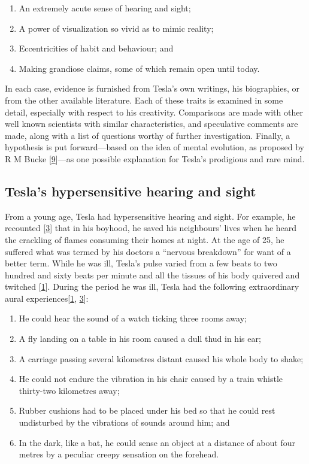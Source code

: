 \documentclass[
  a4paper,
]{article}
\providecommand{\tightlist}{%
  \setlength{\itemsep}{0pt}\setlength{\parskip}{0pt}}
\begin{document}
\begin{enumerate}
\tightlist
\item
  An extremely acute sense of hearing and sight;
\item
  A power of visualization so vivid as to mimic reality;
\item
  Eccentricities of habit and behaviour; and
\item
  Making grandiose claims, some of which remain open until today.
\end{enumerate}

In each case, evidence is furnished from Tesla's own writings, his
biographies, or from the other available literature. Each of these
traits is examined in some detail, especially with respect to his
creativity. Comparisons are made with other well known scientists with
similar characteristics, and speculative comments are made, along with a
list of questions worthy of further investigation. Finally, a hypothesis
is put forward---based on the idea of mental evolution, as proposed by R
M Bucke {[}\protect\hyperlink{ref-bucke48}{9}{]}---as one possible
explanation for Tesla's prodigious and rare mind.

\hypertarget{teslas-hypersensitive-hearing-and-sight}{%
\subsection{Tesla's hypersensitive hearing and
sight}\label{teslas-hypersensitive-hearing-and-sight}}

From a young age, Tesla had hypersensitive hearing and sight. For
example, he recounted {[}\protect\hyperlink{ref-cheney81}{3}{]} that in
his boyhood, he saved his neighbours' lives when he heard the crackling
of flames consuming their homes at night. At the age of 25, he suffered
what was termed by his doctors a ``nervous breakdown'' for want of a
better term. While he was ill, Tesla's pulse varied from a few beats to
two hundred and sixty beats per minute and all the tissues of his body
quivered and twitched {[}\protect\hyperlink{ref-john83}{1}{]}. During
the period he was ill, Tesla had the following extraordinary aural
experiences{[}\protect\hyperlink{ref-john83}{1},
\protect\hyperlink{ref-cheney81}{3}{]}:

\begin{enumerate}
\item
  He could hear the sound of a watch ticking three rooms away;
\item
  A fly landing on a table in his room caused a dull thud in his ear;
\item
  A carriage passing several kilometres distant caused his whole body to
  shake;
\item
  He could not endure the vibration in his chair caused by a train
  whistle thirty-two kilometres away;
\item
  Rubber cushions had to be placed under his bed so that he could rest
  undisturbed by the vibrations of sounds around him; and
\item
  In the dark, like a bat, he could sense an object at a distance of
  about four metres by a peculiar creepy sensation on the forehead.
\end{enumerate}
\end{document}
